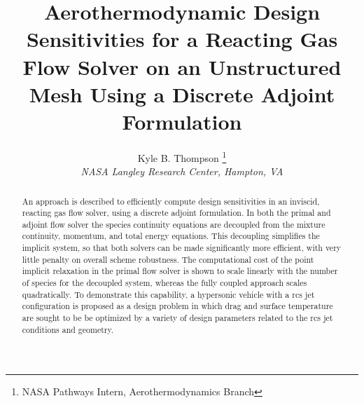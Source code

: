 \documentclass[a4paper]{article}
\title{Aerothermodynamic Design Sensitivities for a Reacting Gas Flow Solver
  on an Unstructured Mesh Using a Discrete Adjoint Formulation}
\date{\vspace{-5ex}}
\author{
  Kyle B. Thompson%
    \thanks{NASA Pathways Intern, Aerothermodynamics Branch} \\
  {\normalsize\itshape NASA Langley Research Center, Hampton, VA} \\
 }
\begin{document}
\maketitle

\begin{abstract}

An approach is described to efficiently compute design sensitivities in an
inviscid, reacting gas flow solver, using a discrete adjoint formulation.  In
both the primal and adjoint flow solver the species continuity equations are
decoupled from the mixture continuity, momentum, and total energy equations.
This decoupling simplifies the implicit system, so that both solvers can be made
significantly more efficient, with very little penalty on overall scheme
robustness.  The computational cost of the point implicit relaxation in the
primal flow solver is shown to scale linearly with the number of species for the
decoupled system, whereas the fully coupled approach scales quadratically. To
demonstrate this capability, a hypersonic vehicle with a rcs jet configuration
is proposed as a design problem in which drag and surface temperature are sought
to be be optimized by a variety of design parameters related to the rcs jet
conditions and geometry.

\end{abstract}
\end{document}
